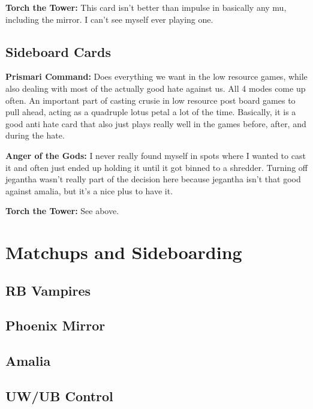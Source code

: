 \documentclass[12pt]{article}
\begin{document}
\vspace{0.4em}
\noindent \textbf{Torch the Tower:}
This card isn't better than impulse in basically any mu, including the mirror. I can't see myself ever playing one.

\subsection{Sideboard Cards}
\label{sec:sbchoices}
\noindent \textbf{Prismari Command:}
Does everything we want in the low resource games, while also dealing with most of the actually good hate against us. All 4 modes come up often. An important part of casting crusie in low resource post board games to pull ahead, acting as a quadruple lotus petal a lot of the time. Basically, it is a good anti hate card that also just plays really well in the games before, after, and during the hate.

\vspace{0.4em}
\noindent \textbf{Anger of the Gods:}
I never really found myself in spots where I wanted to cast it and often just ended up holding it until it got binned to a shredder. Turning off jegantha wasn't really part of the decision here because jegantha isn't that good against amalia, but it's a nice plus to have it.

\vspace{0.4em}
\noindent \textbf{Torch the Tower:}
See above.


\clearpage
\section{Matchups and Sideboarding}
\subsection{RB Vampires}

\subsection{Phoenix Mirror}

\subsection{Amalia}

\subsection{UW/UB Control}
\end{document}
